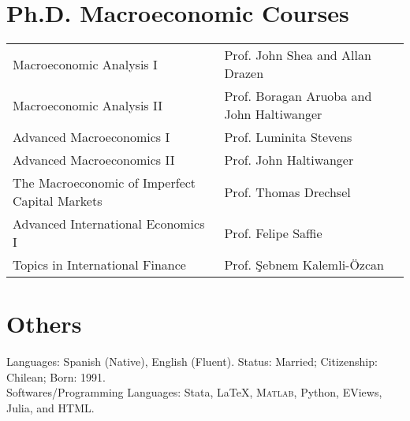 \documentclass[11pt]{article}
\providecommand\Matlab{\textsc{Matlab}}
\begin{document}
\iffalse
\section*{Datasets}

``\emph{Chilean Economic Uncertainty Index}", which tracks economic uncertainty in the Chilean economy. Reported monthly by \href{http://www.clapesuc.cl/indicador/indice-de-incertidumbre-economica-iiec/}{CLAPES UC}.\\
``\emph{Chilean Economic Policy Uncertainty Index}", which tracks economic policy uncertainty in the Chilean economy. Reported monthly at the \href{http://www.policyuncertainty.com/chile_monthly.html}{Economic Policy Uncertainty} website managed by Scott Baker (Northwestern-Kellogg), Nicholas Bloom (Stanford) and Steve Davis (Chicago-Booth).
\fi

\section*{Ph.D. Macroeconomic Courses}
\hspace*{-0.125in}
\begin{tabular}{ll}
    Macroeconomic Analysis I & Prof. John Shea and Allan Drazen\\
    Macroeconomic Analysis II & Prof. Boragan Aruoba and John Haltiwanger\\
    Advanced Macroeconomics I & Prof. Luminita Stevens\\
    Advanced Macroeconomics II & Prof. John Haltiwanger\\
    The Macroeconomic of Imperfect Capital Markets & Prof. Thomas Drechsel\\
    Advanced International Economics I & Prof. Felipe Saffie \\
    Topics in International Finance & Prof. \c{S}ebnem Kalemli-\"{O}zcan    
\end{tabular}




\section*{Others}

Languages: Spanish (Native), English (Fluent). Status: Married; Citizenship: Chilean; Born: 1991.\\[0.2em]
Softwares/Programming Languages: Stata, \LaTeX, \Matlab, Python, EViews, Julia, and HTML.\\[0.2em]
\end{document}
